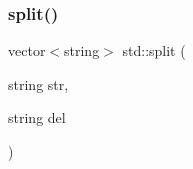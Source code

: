 \mbox{\label{namespacestd_afbda037ce4502f9a197deba4a43bada9}} 
\subsubsection{\texorpdfstring{split()}{split()}}
{\footnotesize\ttfamily vector$<$string$>$ std\+::split (\begin{DoxyParamCaption}\item[{string}]{str,  }\item[{string}]{del }\end{DoxyParamCaption})\hspace{0.3cm}{\ttfamily [inline]}}

